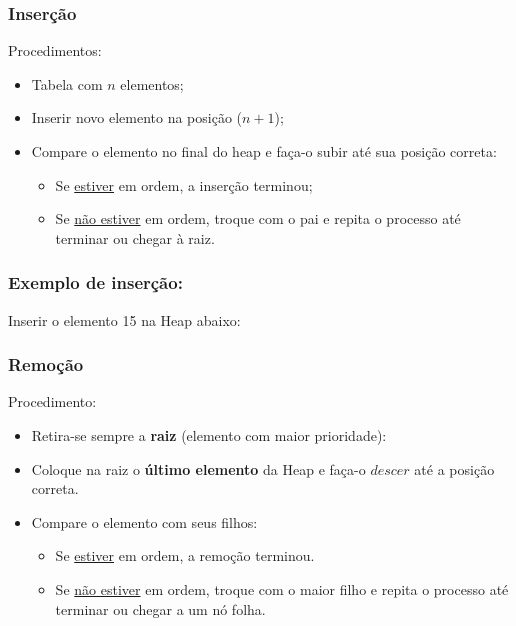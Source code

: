 \documentclass[10pt]{beamer}
\begin{document}
\begin{frame}[t]
    \frametitle{Inserção}
    \large
    Procedimentos:\vspace*{1em}
    \begin{itemize}[<+-|alert@+>]
        \large\color{cinza}\setlength{\itemsep}{1em}
        \item Tabela com $n$ elementos;
        \item Inserir novo elemento na posição ($n+1$);
        \item Compare o elemento no final do heap e faça-o subir até sua posição correta:
              \begin{itemize}
                  \large\color{cinza}\setlength{\itemsep}{1em}
                  \item Se \underline{estiver} em ordem, a inserção terminou;
                  \item Se \underline{não estiver} em ordem, troque com o pai e repita o processo até terminar ou chegar à raiz.
              \end{itemize}
    \end{itemize}
\end{frame}

\begin{frame}[t]
    \frametitle{Exemplo de inserção:}
    \large
    Inserir o elemento 15 na Heap abaixo:\vspace*{1em}

    \centering
\end{frame}

\begin{frame}[t]
    \frametitle{Remoção}
    \large
    Procedimento:\vspace*{1em}
    \begin{itemize}[<+-|alert@+>]
        \large\color{cinza}\setlength{\itemsep}{1em}
        \item Retira-se sempre a \textbf{raiz} (elemento com maior prioridade):
        \item Coloque na raiz o \textbf{último elemento} da Heap e faça-o $descer$ até a posição correta.
        \item Compare o elemento com seus filhos:
              \begin{itemize}\vspace*{1em}
                  \large\setlength{\itemsep}{1em}\color{cinza}
                  \item Se \underline{estiver} em ordem, a remoção terminou.
                  \item Se \underline{não estiver} em ordem, troque com o maior filho e repita o processo até terminar ou chegar a um nó folha.
              \end{itemize}
    \end{itemize}
\end{frame}
\end{document}
